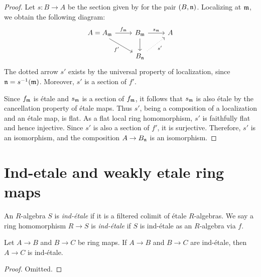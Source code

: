 \begin{proof}
  Let \(s: B \to A\) be the section given by  for the pair \((B, {\mathfrak{n}})\). Localizing at \({\mathfrak{m}}\), we obtain the following diagram:
  \[
  \begin{tikzcd}
    A = A_\m \arrow[r, "f_\m"]\arrow[dr, "f'"'] & B_\m \arrow[d] \arrow[r, "s_\m"] & A \\
    & B_\n \arrow[ur, dotted, "s'"'] &
  \end{tikzcd}
  \]
  The dotted arrow \(s'\) exists by the universal property of localization, since \({\mathfrak{n}} = s^{-1}({\mathfrak{m}})\). Moreover, \(s'\) is a section of \(f'\).

  Since \(f_{\mathfrak{m}}\) is étale and \(s_{\mathfrak{m}}\) is a section of \(f_{\mathfrak{m}}\), it follows that \(s_{\mathfrak{m}}\) is also étale by the cancellation property of étale maps. Thus \(s'\), being a composition of a localization and an étale map, is flat. As a flat local ring homomorphism, \(s'\) is faithfully flat and hence injective. Since \(s'\) is also a section of \(f'\), it is surjective. Therefore, \(s'\) is an isomorphism, and the composition \(A \to B_{\mathfrak{n}}\) is an isomorphism.
\end{proof}

\section{Ind-etale and weakly etale ring maps}

\begin{definition}
    An $R$-algebra $S$ is \emph{ind-étale} if it is a filtered colimit of étale $R$-algebras.
    We say a ring homomorphism $R \to S$ is \emph{ind-étale} if $S$ is ind-étale as an $R$-algebra via $f$.
    \label{def:ind-etale}
    \leanok
\end{definition}

\begin{lemma}
  \label{thm:ind-etale-comp}
  \leanok
  Let $A \to B$ and $B \to C$ be ring maps. If $A \to B$ and $B \to C$ are ind-étale, then $A \to C$ is ind-étale.
\end{lemma}

\begin{proof}
  Omitted.
\end{proof}

